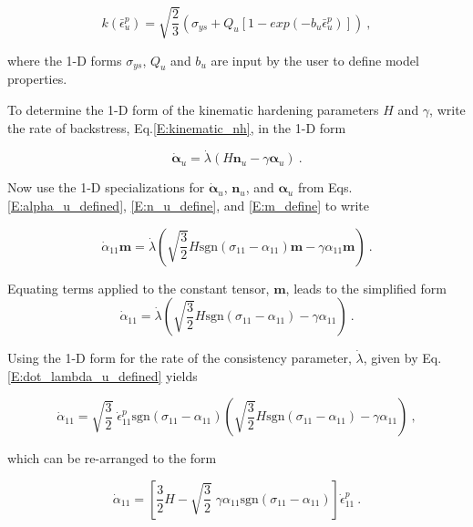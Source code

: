 \documentclass[11pt]{report}
\numberwithin{equation}{section}
\newcommand{\bmf } {\boldsymbol }
\begin{document}
\begin{equation}\label{E:Qu_bu_define}
k\left(\bar \epsilon^p_u\right) = 
\sqrt{ \textstyle {\frac{2}{3}} } 
\left( \sigma_{ys}+
Q_u \left[ 1- exp \left( -b_u \bar \epsilon^p_u \right) \right ]\right)~,
\end{equation}

\noindent where the 1-D forms $\sigma_{ys}$, $Q_u$ and $b_u$ are input by the user to define model properties. 


To determine the 1-D form of the kinematic hardening parameters $H$ and $\gamma$,
write the rate of backstress, Eq.\;\eqref{E:kinematic_nh}, in the 1-D form

\begin{equation}
\dot{\bmf{\alpha}}_u = \dot \lambda \left( H \bmf{n}_u - \gamma \bmf{\alpha}_u \right)~.
\end{equation}

\noindent Now use the 1-D specializations for $\dot{\bmf{\alpha}}_u$, $\bmf{n}_u$, and $\bmf{\alpha}_u$
from Eqs.\;\eqref{E:alpha_u_defined}, \eqref{E:n_u_define}, and \eqref{E:m_define}
to write

\begin{equation}
\dot\alpha_{11} \bmf{m} = \dot\lambda \left (
\sqrt{\textstyle{\frac{3}{2}}} H \text{sgn} \left(\sigma_{11}-\alpha_{11}\right) \bmf{m}-
 \gamma \alpha_{11}\bmf{m} \right)~.
\end{equation}

\noindent Equating terms applied to the constant tensor, $\bmf{m}$, leads to the simplified form
\begin{equation}
\dot\alpha_{11} = \dot\lambda \left (
\sqrt{\textstyle{\frac{3}{2}}} H \text{sgn} \left(\sigma_{11}-\alpha_{11}\right) -
 \gamma \alpha_{11}\right)~.
\end{equation}

\noindent Using the 1-D form for the rate of the consistency parameter, $\dot \lambda$, given by
Eq.\;\eqref{E:dot_lambda_u_defined} yields

\begin{equation}
\dot{\alpha}_{11} = \sqrt{\textstyle{\frac{3}{2}}}\; \dot\epsilon^p_{11}
 \text{sgn} \left(\sigma_{11}-\alpha_{11}\right)
\left (
\sqrt{\textstyle{\frac{3}{2}}} H \text{sgn} \left(\sigma_{11}-\alpha_{11}\right) -
 \gamma \alpha_{11}\right)~,
\end{equation}

\noindent which can be re-arranged to the form


\begin{equation}\label{E:define_Hu_gammau}
\dot{\alpha}_{11} = \left[ \textstyle{\frac{3}{2}} 
H  -
\sqrt{\textstyle{\frac{3}{2}}} \;\gamma \alpha_{11} \text{sgn} \left(\sigma_{11}-\alpha_{11}\right)\right] \dot\epsilon^p_{11}~.
\end{equation}
\end{document}
